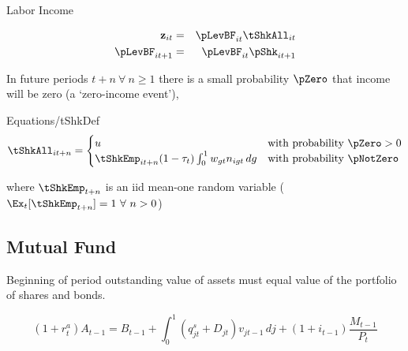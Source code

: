 \documentclass[titlepage]{\econtex}\providecommand{\texname}{BufferStockTheory}
\providecommand{\EqDir}{Equations}
\begin{document}
Labor Income

\begin{eqnarray}
\mathbf{z}_{it} &=& \pLevBF_{it}\tShkAll_{it} \\
\pLevBF_{it+1} &=&\pLevBF_{it} \pShk_{it+1} \\
\end{eqnarray}



In future periods $t+n ~\forall~ n \geq 1$ there is a small probability $\pZero$ that income will
be zero (a `zero-income event'),
\begin{verbatimwrite}{\EqDir/tShkDef}
\begin{equation}
\tShkAll _{it+n}=
\begin{cases}
 u \phantom{_{t+1}/\pNotZero} & \text{with probability $\pZero>0$} \\
 \tShkEmp_{it+n} (1-\tau_{t})\int_{0}^{1} w_{gt}n_{igt} \, dg      & \text{with probability $\pNotZero  $} 
\end{cases} \label{eq:tShkDef}
\end{equation}
\end{verbatimwrite}

where $\tShkEmp_{t+n}$ is an iid mean-one random variable
($\Ex_{t}[{\tShkEmp}_{t+n}]=1~\forall~n>0$)



\begin{comment}
Combining the transition equations, the recursive nature of
the problem allows us to rewrite it more compactly in Bellman equation form,
\begin{eqnarray*}
\VFunc_{t}(\mLevBF_{t},\pLevBF_{t}) & = & \max_{\cLevBF_{t}}~\left\{\util(\cLevBF_{t})+\DiscFac \Ex_{t}\left[ \VFunc_{t+1}((\mLevBF_{t}-\cLevBF_{t})\Rfree+ \pLevBF_{t+1}\tShkAll_{t+1},\pLevBF_{t} \PGro  \pShk_{t+1})\right]\right\}
.
\end{eqnarray*}
\end{comment}

\hypertarget{Mutual Fund}{}
\subsection{Mutual Fund}

\label{subsec:Mutual Fund}



Beginning of  period outstanding value of assets must equal value of the portfolio of shares and bonds.

$$(1+r^{a}_{t}) A_{t-1} =  B_{t-1} + \int_{0}^{1} (q^{s}_{jt}+ D_{jt})\mathit{v}_{jt-1} \, dj +(1+i_{t-1}) \frac{M_{t-1}}{P_{t}}$$
\end{document}
